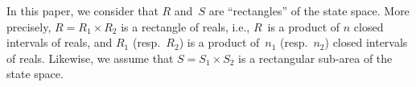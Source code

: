 In this paper, we consider that $R$ and~$S$ are ``rectangles''
of the state space.
More precisely, $R=R_1\times R_2$ is a rectangle of reals, i.e.,
$R$~is a product of $n$ closed intervals of reals,
and $R_1$ (resp.~$R_2$) is a product of~$n_1$ (resp.~$n_2$) closed intervals
of reals.
Likewise, we assume that $S=S_1\times S_2$ is a rectangular
sub-area of the state space.
%
%
%
%
%
